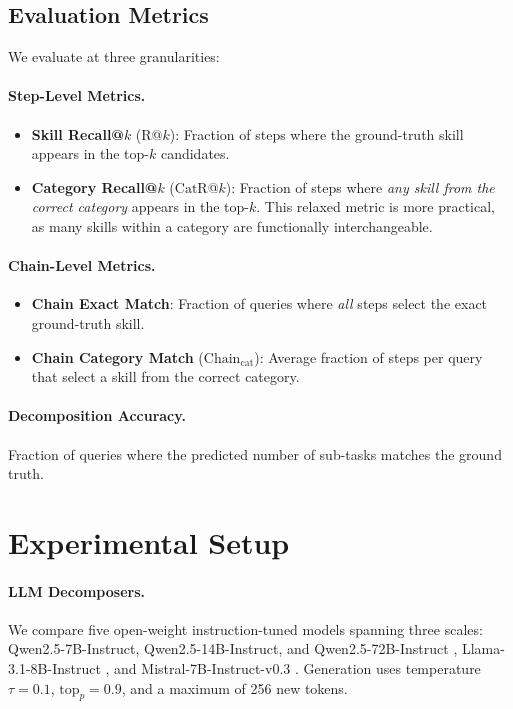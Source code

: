 \documentclass[11pt]{article}
\newcommand{\catrecall}{\text{CatR}}
\newcommand{\chaincat}{\text{Chain}_\text{cat}}
\begin{document}
\subsection{Evaluation Metrics}

We evaluate at three granularities:

\paragraph{Step-Level Metrics.}
\begin{itemize}[nosep,leftmargin=*]
  \item \textbf{Skill Recall@$k$} (R@$k$): Fraction of steps where the ground-truth skill appears in the top-$k$ candidates.
  \item \textbf{Category Recall@$k$} ($\catrecall$@$k$): Fraction of steps where \emph{any skill from the correct category} appears in the top-$k$.
  This relaxed metric is more practical, as many skills within a category are functionally interchangeable.
\end{itemize}

\paragraph{Chain-Level Metrics.}
\begin{itemize}[nosep,leftmargin=*]
  \item \textbf{Chain Exact Match}: Fraction of queries where \emph{all} steps select the exact ground-truth skill.
  \item \textbf{Chain Category Match} ($\chaincat$): Average fraction of steps per query that select a skill from the correct category.
\end{itemize}

\paragraph{Decomposition Accuracy.} Fraction of queries where the predicted number of sub-tasks matches the ground truth.

\section{Experimental Setup}
\label{sec:setup}

\paragraph{LLM Decomposers.}
We compare five open-weight instruction-tuned models spanning three scales:
Qwen2.5-7B-Instruct, Qwen2.5-14B-Instruct, and Qwen2.5-72B-Instruct \cite{qwen2.5}, 
Llama-3.1-8B-Instruct \cite{dubey2024llama3}, and 
Mistral-7B-Instruct-v0.3 \cite{jiang2023mistral}.
Generation uses temperature $\tau=0.1$, $\text{top}_p=0.9$, and a maximum of 256 new tokens.
\end{document}

